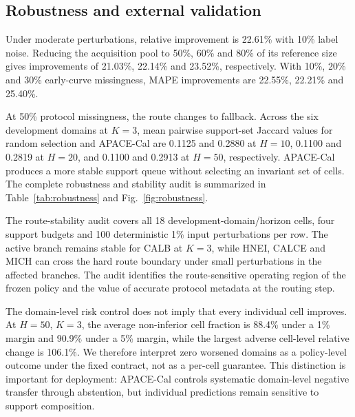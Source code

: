 \documentclass[preprint,12pt]{elsarticle}
\begin{document}
\subsection{Robustness and external validation}

Under moderate perturbations, relative improvement is 22.61\% with 10\% label noise. Reducing the acquisition pool to 50\%, 60\% and 80\% of its reference size gives improvements of 21.03\%, 22.14\% and 23.52\%, respectively. With 10\%, 20\% and 30\% early-curve missingness, MAPE improvements are 22.55\%, 22.21\% and 25.40\%.

At 50\% protocol missingness, the route changes to fallback. Across the six development domains at $K=3$, mean pairwise support-set Jaccard values for random selection and APACE-Cal are 0.1125 and 0.2880 at $H=10$, 0.1100 and 0.2819 at $H=20$, and 0.1100 and 0.2913 at $H=50$, respectively. APACE-Cal produces a more stable support queue without selecting an invariant set of cells. The complete robustness and stability audit is summarized in Table~\ref{tab:robustness} and Fig.~\ref{fig:robustness}.

The route-stability audit covers all 18 development-domain/horizon cells, four support budgets and 100 deterministic 1\% input perturbations per row. The active branch remains stable for CALB at $K=3$, while HNEI, CALCE and MICH can cross the hard route boundary under small perturbations in the affected branches. The audit identifies the route-sensitive operating region of the frozen policy and the value of accurate protocol metadata at the routing step.

The domain-level risk control does not imply that every individual cell improves. At $H=50$, $K=3$, the average non-inferior cell fraction is 88.4\% under a 1\% margin and 90.9\% under a 5\% margin, while the largest adverse cell-level relative change is 106.1\%. We therefore interpret zero worsened domains as a policy-level outcome under the fixed contract, not as a per-cell guarantee. This distinction is important for deployment: APACE-Cal controls systematic domain-level negative transfer through abstention, but individual predictions remain sensitive to support composition.
\end{document}
